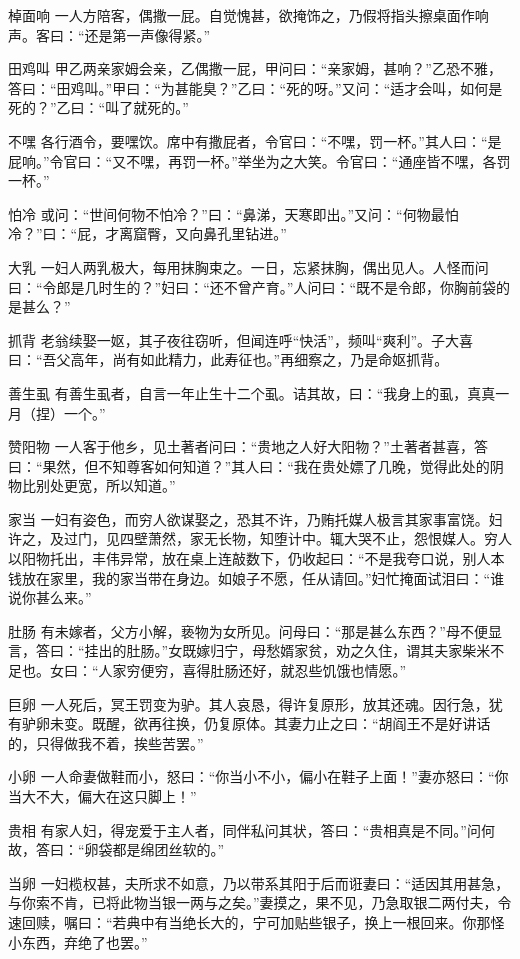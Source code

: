 \documentclass[12pt,UTF8]{ctexbook}
\begin{document}
棹面响
一人方陪客，偶撒一屁。自觉愧甚，欲掩饰之，乃假将指头擦桌面作响声。客曰：“还是第一声像得紧。”

田鸡叫
甲乙两亲家姆会亲，乙偶撒一屁，甲问曰：“亲家姆，甚响？”乙恐不雅，答曰：“田鸡叫。”甲曰：“为甚能臭？”乙曰：“死的呀。”又问：“适才会叫，如何是死的？”乙曰：“叫了就死的。”

不嘿
各行酒令，要嘿饮。席中有撒屁者，令官曰：“不嘿，罚一杯。”其人曰：“是屁响。”令官曰：“又不嘿，再罚一杯。”举坐为之大笑。令官曰：“通座皆不嘿，各罚一杯。”

怕冷
或问：“世间何物不怕冷？”曰：“鼻涕，天寒即出。”又问：“何物最怕冷？”曰：“屁，才离窟臀，又向鼻孔里钻进。”

大乳
一妇人两乳极大，每用抹胸束之。一日，忘紧抹胸，偶出见人。人怪而问曰：“令郎是几时生的？”妇曰：“还不曾产育。”人问曰：“既不是令郎，你胸前袋的是甚么？”

抓背
老翁续娶一妪，其子夜往窃听，但闻连呼“快活”，频叫“爽利”。子大喜曰：“吾父高年，尚有如此精力，此寿征也。”再细察之，乃是命妪抓背。

善生虱
有善生虱者，自言一年止生十二个虱。诘其故，曰：“我身上的虱，真真一月（捏）一个。”

赞阳物
一人客于他乡，见土著者问曰：“贵地之人好大阳物？”土著者甚喜，答曰：“果然，但不知尊客如何知道？”其人曰：“我在贵处嫖了几晚，觉得此处的阴物比别处更宽，所以知道。”

家当
一妇有姿色，而穷人欲谋娶之，恐其不许，乃贿托媒人极言其家事富饶。妇许之，及过门，见四壁萧然，家无长物，知堕计中。辄大哭不止，怨恨媒人。穷人以阳物托出，丰伟异常，放在桌上连敲数下，仍收起曰：“不是我夸口说，别人本钱放在家里，我的家当带在身边。如娘子不愿，任从请回。”妇忙掩面试泪曰：“谁说你甚么来。”

肚肠
有未嫁者，父方小解，亵物为女所见。问母曰：“那是甚么东西？”母不便显言，答曰：“挂出的肚肠。”女既嫁归宁，母愁婿家贫，劝之久住，谓其夫家柴米不足也。女曰：“人家穷便穷，喜得肚肠还好，就忍些饥饿也情愿。”

巨卵
一人死后，冥王罚变为驴。其人哀恳，得许复原形，放其还魂。因行急，犹有驴卵未变。既醒，欲再往换，仍复原体。其妻力止之曰：“胡阎王不是好讲话的，只得做我不着，挨些苦罢。”

小卵
一人命妻做鞋而小，怒曰：“你当小不小，偏小在鞋子上面！”妻亦怒曰：“你当大不大，偏大在这只脚上！”

贵相
有家人妇，得宠爱于主人者，同伴私问其状，答曰：“贵相真是不同。”问何故，答曰：“卵袋都是绵团丝软的。”

当卵
一妇榄权甚，夫所求不如意，乃以带系其阳于后而诳妻曰：“适因其用甚急，与你索不肯，已将此物当银一两与之矣。”妻摸之，果不见，乃急取银二两付夫，令速回赎，嘱曰：“若典中有当绝长大的，宁可加贴些银子，换上一根回来。你那怪小东西，弃绝了也罢。”
\end{document}
